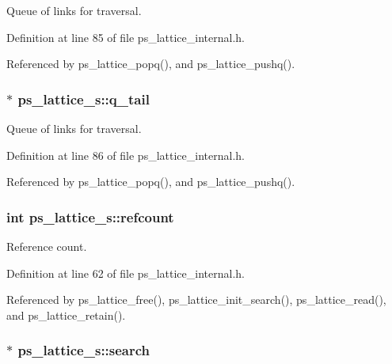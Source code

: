 Queue of links for traversal. 



Definition at line 85 of file ps\-\_\-lattice\-\_\-internal.\-h.



Referenced by ps\-\_\-lattice\-\_\-popq(), and ps\-\_\-lattice\-\_\-pushq().

\subsubsection[{q\-\_\-tail}]{$\ast$ ps\-\_\-lattice\-\_\-s\-::q\-\_\-tail}\label{structps__lattice__s_a5a9faf5e4aabd84a868d1bff97dd9814}


Queue of links for traversal. 



Definition at line 86 of file ps\-\_\-lattice\-\_\-internal.\-h.



Referenced by ps\-\_\-lattice\-\_\-popq(), and ps\-\_\-lattice\-\_\-pushq().

\subsubsection[{refcount}]{\setlength{\rightskip}{0pt plus 5cm}int ps\-\_\-lattice\-\_\-s\-::refcount}\label{structps__lattice__s_a6d66b392dec016b3304da2f53be17dd1}


Reference count. 



Definition at line 62 of file ps\-\_\-lattice\-\_\-internal.\-h.



Referenced by ps\-\_\-lattice\-\_\-free(), ps\-\_\-lattice\-\_\-init\-\_\-search(), ps\-\_\-lattice\-\_\-read(), and ps\-\_\-lattice\-\_\-retain().

\subsubsection[{search}]{$\ast$ ps\-\_\-lattice\-\_\-s\-::search}\label{structps__lattice__s_a9ebaeb7be7a83980569f0c544eb6babb}


